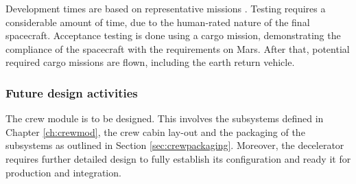 Development times are based on representative missions \cite{Wertz2011}. Testing requires a considerable amount of time, due to the human-rated nature of the final spacecraft. Acceptance testing is done using a cargo mission, demonstrating the compliance of the spacecraft with the requirements on Mars. After that, potential required cargo missions are flown, including the earth return vehicle.

\subsubsection{Future design activities}
The crew module is to be designed. This involves the subsystems defined in Chapter \ref{ch:crewmod}, the crew cabin lay-out and the packaging of the subsystems as outlined in Section \ref{sec:crewpackaging}. Moreover, the decelerator requires further detailed design to fully establish its configuration and ready it for production and integration. 

